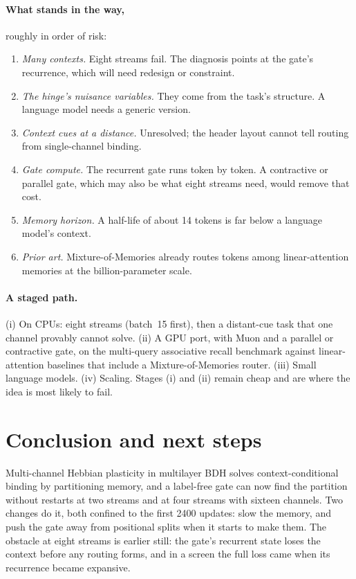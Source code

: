 \documentclass[11pt]{article}
\begin{document}
\paragraph{What stands in the way,} roughly in order of risk:
\begin{enumerate}
\item \emph{Many contexts.} Eight streams fail. The diagnosis points at the gate's recurrence, which will need redesign or constraint.
\item \emph{The hinge's nuisance variables.} They come from the task's structure. A language model needs a generic version.
\item \emph{Context cues at a distance.} Unresolved; the header layout cannot tell routing from single-channel binding.
\item \emph{Gate compute.} The recurrent gate runs token by token. A contractive or parallel gate, which may also be what eight streams need, would remove that cost.
\item \emph{Memory horizon.} A half-life of about 14 tokens is far below a language model's context.
\item \emph{Prior art.} Mixture-of-Memories \cite{mom} already routes tokens among linear-attention memories at the billion-parameter scale.
\end{enumerate}

\paragraph{A staged path.} (i) On CPUs: eight streams (batch~15 first), then a distant-cue task that one channel provably cannot solve. (ii) A GPU port, with Muon and a parallel or contractive gate, on the multi-query associative recall benchmark \cite{zoology} against linear-attention baselines that include a Mixture-of-Memories router. (iii) Small language models. (iv) Scaling. Stages (i) and (ii) remain cheap and are where the idea is most likely to fail.

\section{Conclusion and next steps}

Multi-channel Hebbian plasticity in multilayer BDH solves context-conditional binding by partitioning memory, and a label-free gate can now find the partition without restarts at two streams and at four streams with sixteen channels. Two changes do it, both confined to the first 2400 updates: slow the memory, and push the gate away from positional splits when it starts to make them. The obstacle at eight streams is earlier still: the gate's recurrent state loses the context before any routing forms, and in a screen the full loss came when its recurrence became expansive.
\end{document}
